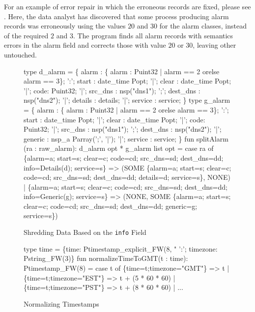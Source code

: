 \documentclass{entcs}
\begin{document}
For an example of error repair in which the erroneous records are
fixed, please see . Here, the data analyst
has discovered that some process producing alarm records was
erroneously using the values $20$ and $30$ for the alarm classes,
instead of the required $2$ and $3$. The program finds all alarm
records with semantics errors in the alarm field and corrects those
with value $20$ or $30$, leaving other untouched.

\begin{figure}
  \centering
  \begin{code}
type d_alarm = \{
       alarm    :  \{ alarm : Puint32 | alarm == 2 
                                        orelse alarm == 3\};
 ':';  start :  date_time Popt;
 '|';  clear :  date_time Popt;
 '|';  code: Puint32;
 '|';  src_dns  :  nsp("dns1");
 ';';  dest_dns :  nsp("dns2");
 '|';  details  : details;
 '|';  service  :  service;
\}
\mbox{}
type g_alarm = \{
       alarm    :  \{ alarm : Puint32 | alarm == 2 
                                        orelse alarm == 3\};
 ':';  start :  date_time Popt;
 '|';  clear :  date_time Popt;
 '|';  code: Puint32;
 '|';  src_dns  :  nsp("dns1");
 ';';  dest_dns :  nsp("dns2");
 '|';  generic  : nsp_a Parray(';', '|');
 '|';  service  :  service;
\}
\mbox{}
fun splitAlarm (ra : raw_alarm): 
    d_alarm opt * g_alarm list opt
  = case ra of
        \{alarm=a; start=s; clear=c; code=cd; 
         src_dns=sd; dest_dns=dd; 
         info=Details(d); service=s\} 
        => 
        (SOME \{alarm=a; start=s; clear=c; 
               code=cd; src_dns=sd; dest_dns=dd; 
               details=d; service=s\}, 
         NONE)
      | \{alarm=a; start=s; clear=c; code=cd; 
         src_dns=sd; dest_dns=dd; 
         info=Generic(g); service=s\} 
        => 
        (NONE,
         SOME \{alarm=a; start=s; clear=c; 
               code=cd; src_dns=sd; dest_dns=dd; 
               generic=g; service=s\})    
  \end{code}
  \label{fig:ex-no-err-check}
  \caption{Shredding \darkstar{} Data Based on the {\tt info} Field}
\end{figure}

\begin{figure}
  \centering
  \begin{code}
type time = 
  \{time: Ptimestamp_explicit_FW(8, "%
   ':'; timezone: Pstring_FW(3)\}
\mbox{}
fun normalizeTimeToGMT(t : time): Ptimestamp_FW(8) =
    case t of
      \{time=t;timezone="GMT"\} => t
    | \{time=t;timezone="EST"\} => t + (5 * 60 * 60)
    | \{time=t;timezone="PST"\} => t + (8 * 60 * 60)
    | ...    
  \end{code}
  \caption{Normalizing Timestamps}
  \label{fig:ex-normalize}
\end{figure}
\end{document}
